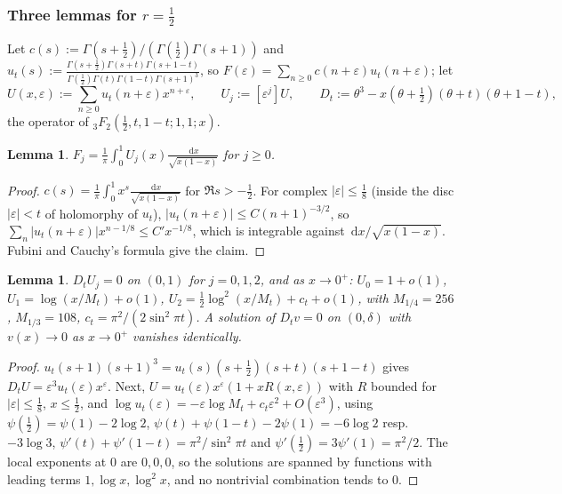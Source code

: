 \documentclass[11pt]{amsart}
\newtheorem{lemma}[theorem]{Lemma}
\theoremstyle{definition}
\theoremstyle{remark}
\numberwithin{equation}{section}
\newcommand{\dd}{\,\mathrm{d}}
\begin{document}
\subsubsection{\texorpdfstring{Three lemmas for $r=\frac12$}{Three lemmas for r=1/2}}
Let $c(s):=\Gamma(s+\frac12)/(\Gamma(\frac12)\Gamma(s+1))$ and $u_t(s):=\frac{\Gamma(s+\frac12)\Gamma(s+t)\Gamma(s+1-t)}{\Gamma(\frac12)\Gamma(t)\Gamma(1-t)\Gamma(s+1)^3}$, so $F(\varepsilon)=\sum_{n\ge0}c(n+\varepsilon)u_t(n+\varepsilon)$; let
\[
U(x,\varepsilon):=\sum_{n\ge0}u_t(n+\varepsilon)x^{n+\varepsilon},\qquad U_j:=[\varepsilon^j]U,\qquad D_t:=\theta^3-x(\theta+\tfrac12)(\theta+t)(\theta+1-t),
\]
the operator of ${}_3F_2(\frac12,t,1-t;1,1;x)$.

\begin{lemma}\label{lem:Zint}
$F_j=\frac1\pi\int_0^1U_j(x)\frac{\dd x}{\sqrt{x(1-x)}}$ for $j\ge0$.
\end{lemma}
\begin{proof}
$c(s)=\frac1\pi\int_0^1x^s\frac{\dd x}{\sqrt{x(1-x)}}$ for $\Re s>-\frac12$. For complex $|\varepsilon|\le\frac18$ (inside the disc $|\varepsilon|<t$ of holomorphy of $u_t$), $|u_t(n+\varepsilon)|\le C(n+1)^{-3/2}$, so $\sum_n|u_t(n+\varepsilon)|x^{n-1/8}\le C'x^{-1/8}$, which is integrable against $\dd x/\sqrt{x(1-x)}$. Fubini and Cauchy's formula give the claim.
\end{proof}

\begin{lemma}\label{lem:Uj}
$D_tU_j=0$ on $(0,1)$ for $j=0,1,2$, and as $x\to0^+$: $U_0=1+o(1)$, $U_1=\log(x/M_t)+o(1)$, $U_2=\frac12\log^2(x/M_t)+c_t+o(1)$, with $M_{1/4}=256$, $M_{1/3}=108$, $c_t=\pi^2/(2\sin^2\pi t)$. A solution of $D_tv=0$ on $(0,\delta)$ with $v(x)\to0$ as $x\to0^+$ vanishes identically.
\end{lemma}
\begin{proof}
$u_t(s+1)(s+1)^3=u_t(s)(s+\frac12)(s+t)(s+1-t)$ gives $D_tU=\varepsilon^3u_t(\varepsilon)x^\varepsilon$. Next, $U=u_t(\varepsilon)x^\varepsilon(1+xR(x,\varepsilon))$ with $R$ bounded for $|\varepsilon|\le\frac18$, $x\le\frac12$, and $\log u_t(\varepsilon)=-\varepsilon\log M_t+c_t\varepsilon^2+O(\varepsilon^3)$, using $\psi(\frac12)=\psi(1)-2\log2$, $\psi(t)+\psi(1-t)-2\psi(1)=-6\log2$ resp.\ $-3\log3$, $\psi'(t)+\psi'(1-t)=\pi^2/\sin^2\pi t$ and $\psi'(\frac12)=3\psi'(1)=\pi^2/2$. The local exponents at $0$ are $0,0,0$, so the solutions are spanned by functions with leading terms $1,\log x,\log^2x$, and no nontrivial combination tends to $0$.
\end{proof}
\end{document}
